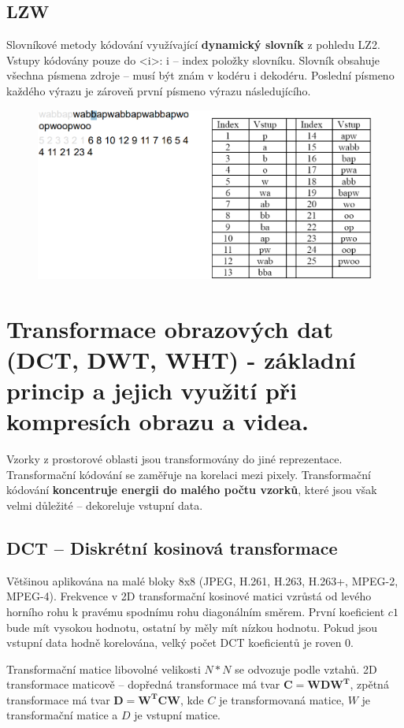 \subsection{LZW}

Slovníkové metody kódování využívající \textbf{dynamický slovník} z pohledu LZ2. Vstupy kódovány pouze do  <i>: i -- index položky slovníku. Slovník obsahuje všechna
písmena zdroje – musí být znám v kodéru i dekodéru. Poslední písmeno každého výrazu je zároveň první písmeno výrazu následujícího.

\begin{figure}[ht]
    \centering
    \includegraphics[width=0.7\linewidth]{images/LZW.png}
\end{figure}
\FloatBarrier


\section{Transformace obrazových dat (DCT, DWT, WHT) - základní princip a jejich využití při kompresích obrazu a videa.}


Vzorky z prostorové oblasti jsou transformovány do jiné reprezentace. Transformační kódování se zaměřuje na korelaci mezi pixely. Transformační kódování \textbf{koncentruje energii do malého počtu vzorků}, které jsou však velmi důležité -- dekoreluje vstupní data.

\subsection{DCT -- Diskrétní kosinová transformace}

Většinou aplikována na malé bloky 8x8 (JPEG, H.261, H.263, H.263+, MPEG-2, MPEG-4). Frekvence v 2D transformační kosinové matici vzrůstá od levého horního rohu k pravému spodnímu rohu diagonálním směrem. První koeficient $c1$ bude mít vysokou hodnotu, ostatní by měly mít nízkou hodnotu. Pokud jsou vstupní data hodně korelována, velký počet DCT koeficientů je roven 0.

Transformační matice libovolné velikosti $N*N$ se odvozuje podle vztahů. 2D transformace maticově -- dopředná transformace má tvar $\boldsymbol{C=WDW^T}$, zpětná transformace má tvar $\boldsymbol{D=W^TCW}$, kde $C$ je transformovaná matice, $W$ je transformační matice a $D$ je vstupní matice.



